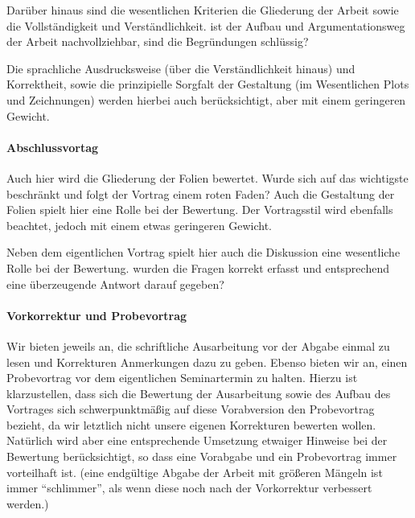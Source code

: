 Darüber hinaus sind die wesentlichen Kriterien die Gliederung der Arbeit sowie die Vollständigkeit und Verständlichkeit.
\Dah ist der Aufbau und Argumentationsweg der Arbeit nachvollziehbar, sind die Begründungen schlüssig?

Die sprachliche Ausdrucksweise (über die Verständlichkeit hinaus) und Korrektheit, sowie die prinzipielle Sorgfalt der Gestaltung (im Wesentlichen Plots und Zeichnungen) werden hierbei auch berücksichtigt, aber mit einem geringeren Gewicht.


\paragraph{Abschlussvortag}
Auch hier wird die Gliederung der Folien bewertet.
Wurde sich auf das wichtigste beschränkt und folgt der Vortrag einem roten Faden?
Auch die Gestaltung der Folien spielt hier eine Rolle bei der Bewertung.
Der Vortragsstil wird ebenfalls beachtet, jedoch mit einem etwas geringeren Gewicht.

Neben dem eigentlichen Vortrag spielt hier auch die Diskussion eine wesentliche Rolle bei der Bewertung.
\Dah wurden die Fragen korrekt erfasst und entsprechend eine überzeugende Antwort darauf gegeben?



\paragraph{Vorkorrektur und Probevortrag}
Wir bieten jeweils an, die schriftliche Ausarbeitung vor der Abgabe einmal zu lesen und Korrekturen \bzw Anmerkungen dazu zu geben.
Ebenso bieten wir an, einen Probevortrag vor dem eigentlichen Seminartermin zu halten.
Hierzu ist klarzustellen, dass sich die Bewertung der Ausarbeitung sowie des Aufbau des Vortrages sich schwerpunktmäßig auf diese Vorabversion \bzw den Probevortrag bezieht, da wir letztlich nicht unsere eigenen Korrekturen bewerten wollen.
Natürlich wird aber eine entsprechende Umsetzung etwaiger Hinweise bei der Bewertung berücksichtigt, so dass eine Vorabgabe und ein Probevortrag immer vorteilhaft ist.
(\Dah eine endgültige Abgabe der Arbeit mit größeren Mängeln ist immer "`schlimmer"', als wenn diese noch nach der Vorkorrektur verbessert werden.)
